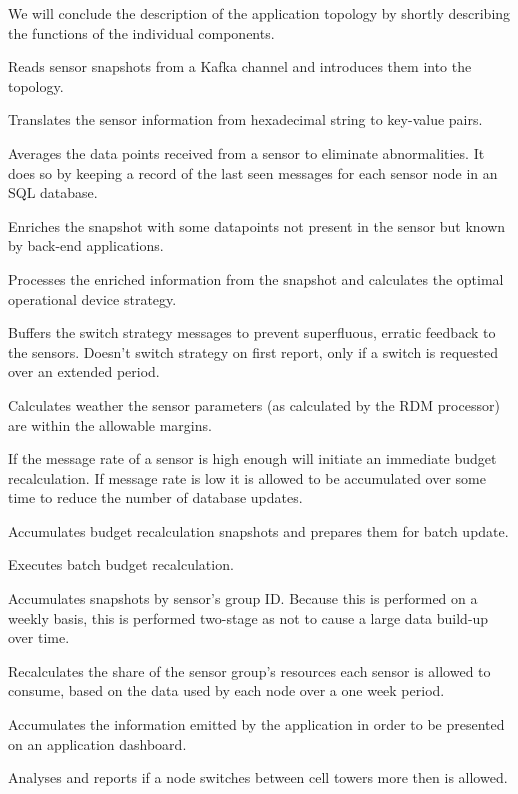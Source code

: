 We will conclude the description of the application topology by shortly describing the functions of the individual components.
\begin{description}[style=nextline]
\nospace
\item[Sensit spout] Reads sensor snapshots from a Kafka channel and introduces them into the topology.
\item[Translator] Translates the sensor information from hexadecimal string to key-value pairs.
\item[Nuancer] Averages the data points received from a sensor to eliminate abnormalities. It does so by keeping a record of the last seen messages for each sensor node in an SQL database.
\item[Attributor] Enriches the snapshot with some datapoints not present in the sensor but known by  back-end applications.
\item[Sensor RDM processor] Processes the enriched information from the snapshot and calculates the optimal operational device strategy.
\item[Switch strategy buffer] Buffers the switch strategy messages to prevent superfluous, erratic feedback to the sensors. Doesn't switch strategy on first report, only if a switch is requested over an extended period.
\item[Single message analyser] Calculates weather the sensor parameters (as calculated by the RDM processor) are within the allowable margins.
\item[Budget recalculator interface]If the message rate of a sensor is high enough will initiate an immediate budget recalculation. If message rate is low it is allowed to be accumulated over some time to reduce the number of database updates.
\item[Budget recalculator accumulator] Accumulates budget recalculation snapshots and prepares them  for batch update.
\item[Budget recalculator] Executes batch budget recalculation.
\item[Group accumulator] Accumulates snapshots by sensor's group ID. Because this is performed on a weekly basis, this is performed two-stage as not to cause a large data build-up over time.
\item[Group share recalculator] Recalculates the share of the sensor group's resources each sensor is allowed to consume, based on the data used by each node over a one week period.
\item[Application accumulator] Accumulates the information emitted by the application in order to be presented on an application dashboard.
\item[Cell Switch Analyser] Analyses and reports if a node switches between cell towers more then is allowed.
\end{description}


